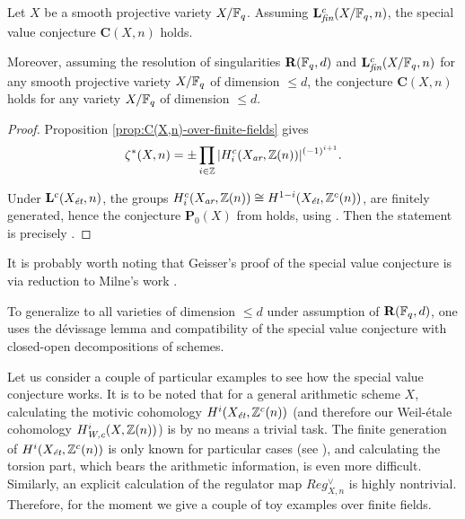 \documentclass{article}
\numberwithin{equation}{section}
\begin{document}
\begin{theorem}
  Let $X$ be a smooth projective variety $X/\FF_q$. Assuming
  $\mathbf{L}_\fin^c (X/\FF_q,n)$, the special value conjecture
  $\mathbf{C} (X,n)$ holds.

  Moreover, assuming the resolution of singularities $\mathbf{R} (\FF_q,d)$ and
  $\mathbf{L}_\fin^c (X/\FF_q,n)$ for any smooth projective variety $X/\FF_q$ of
  dimension $\le d$, the conjecture $\mathbf{C} (X,n)$ holds for any variety
  $X/\FF_q$ of dimension $\le d$.

  \begin{proof}
    Proposition \ref{prop:C(X,n)-over-finite-fields} gives
    \[ \zeta^* (X,n) =
      \pm \prod_{i \in \ZZ} |H_i^c (X_\ar, \ZZ (n))|^{(-1)^{i+1}}. \]

    Under $\mathbf{L}^c (X_\et,n)$, the groups
    $H_i^c (X_\ar, \ZZ(n)) \cong H^{1-i} (X_\et, \ZZ^c (n))$, are finitely
    generated, hence the conjecture $\mathbf{P}_0 (X)$ from
    \cite[\S 4]{Geisser-2010-arithmetic-homology} holds, using
    \cite[Proposition~4.1]{Geisser-2010-arithmetic-homology}.
    Then the statement is precisely
    \cite[Theorem~4.5]{Geisser-2010-arithmetic-homology}.
  \end{proof}
\end{theorem}

\begin{remark}
  It is probably worth noting that Geisser's proof of the special value
  conjecture is via reduction to Milne's work \cite{Milne-1986}.

  To generalize to all varieties of dimension $\le d$ under assumption of
  $\mathbf{R} (\FF_q,d)$, one uses the dévissage lemma
  \cite[Lemma~2.7]{Geisser-2006} and compatibility of the special value
  conjecture with closed-open decompositions of schemes.
\end{remark}

Let us consider a couple of particular examples to see how the special value
conjecture works. It is to be noted that for a general arithmetic scheme $X$,
calculating the motivic cohomology $H^i (X_\et, \ZZ^c (n))$ (and therefore our
Weil-étale cohomology $H^i_\Wc (X, \ZZ(n))$) is by no means a trivial task. The
finite generation of $H^i (X_\et, \ZZ^c (n))$ is only known for particular cases
(see \cite[\S 8]{Beshenov-Weil-etale-1}), and calculating the torsion part,
which bears the arithmetic information, is even more difficult. Similarly, an
explicit calculation of the regulator map $Reg_{X,n}^\vee$ is highly
nontrivial. Therefore, for the moment we give a couple of toy examples over
finite fields.
\end{document}
